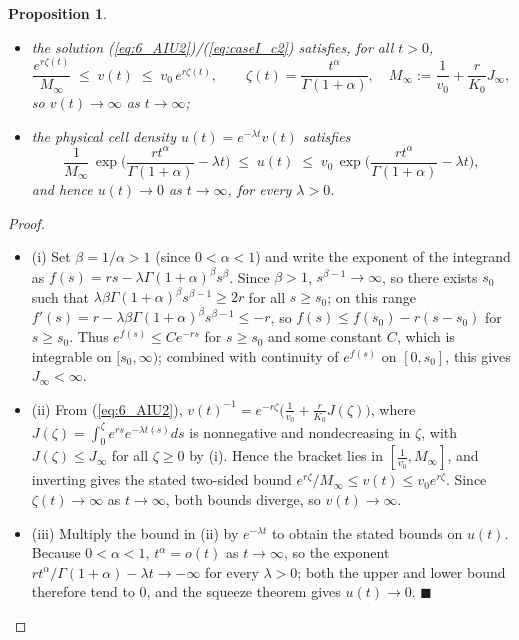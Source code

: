 \documentclass{article}
\newtheorem{proposition}[theorem]{Proposition}
\begin{document}
\begin{description}
\begin{itemize}
\begin{proposition}
\begin{itemize}
\item[(ii)] the solution (\ref{eq:6_AIU2})/(\ref{eq:caseI_c2}) satisfies, for all $t>0$,
$$\frac{e^{r\zeta(t)}}{M_\infty} \;\le\; v(t) \;\le\; v_0\,e^{r\zeta(t)}, \qquad \zeta(t)=\frac{t^\alpha}{\Gamma(1+\alpha)},\quad M_\infty:=\frac{1}{v_0}+\frac{r}{K_0}J_\infty,$$
so $v(t)\to\infty$ as $t\to\infty$;
\item[(iii)] the physical cell density $u(t)=e^{-\lambda t}v(t)$ satisfies
$$\frac{1}{M_\infty}\,\exp\!\Big(\frac{rt^\alpha}{\Gamma(1+\alpha)}-\lambda t\Big) \;\le\; u(t) \;\le\; v_0\,\exp\!\Big(\frac{rt^\alpha}{\Gamma(1+\alpha)}-\lambda t\Big),$$
and hence $u(t)\to 0$ as $t\to\infty$, for every $\lambda>0$.
\end{itemize}
\end{proposition}
\begin{proof}
\begin{itemize}
\item[] (i) Set $\beta=1/\alpha>1$ (since $0<\alpha<1$) and write the exponent of the integrand as $f(s)=rs-\lambda\Gamma(1+\alpha)^{\beta}s^{\beta}$. Since $\beta>1$, $s^{\beta-1}\to\infty$, so there exists $s_0$ such that $\lambda\beta\Gamma(1+\alpha)^{\beta}s^{\beta-1}\ge 2r$ for all $s\ge s_0$; on this range $f'(s)=r-\lambda\beta\Gamma(1+\alpha)^\beta s^{\beta-1}\le -r$, so $f(s)\le f(s_0)-r(s-s_0)$ for $s\ge s_0$. Thus $e^{f(s)}\le C e^{-rs}$ for $s\ge s_0$ and some constant $C$, which is integrable on $[s_0,\infty)$; combined with continuity of $e^{f(s)}$ on $[0,s_0]$, this gives $J_\infty<\infty$.


\item[] (ii) From (\ref{eq:6_AIU2}), $v(t)^{-1}=e^{-r\zeta}\big(\tfrac{1}{v_0}+\tfrac{r}{K_0}J(\zeta)\big)$, where $J(\zeta)=\int_0^\zeta e^{rs}e^{-\lambda t(s)}ds$ is nonnegative and nondecreasing in $\zeta$, with $J(\zeta)\le J_\infty$ for all $\zeta\ge0$ by (i). Hence the bracket lies in $[\tfrac1{v_0},M_\infty]$, and inverting gives the stated two-sided bound $e^{r\zeta}/M_\infty\le v(t)\le v_0 e^{r\zeta}$. Since $\zeta(t)\to\infty$ as $t\to\infty$, both bounds diverge, so $v(t)\to\infty$.


\item[] (iii) Multiply the bound in (ii) by $e^{-\lambda t}$ to obtain the stated bounds on $u(t)$. Because $0<\alpha<1$, $t^\alpha=o(t)$ as $t\to\infty$, so the exponent $rt^\alpha/\Gamma(1+\alpha)-\lambda t\to-\infty$ for every $\lambda>0$; both the upper and lower bound therefore tend to $0$, and the squeeze theorem gives $u(t)\to 0$. $\blacksquare$



\end{itemize}
\end{proof}
\end{itemize}
\end{description}
\end{document}

